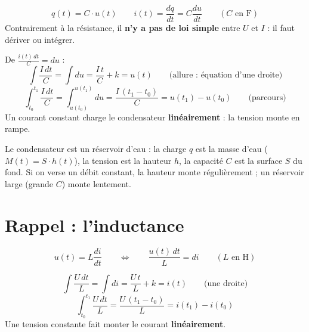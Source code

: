 
\begin{defnbox}[title={Le condensateur (appelé abusivement \og capacité\fg{})}]
\[ q(t) = C\cdot u(t) \qquad i(t) = \frac{dq}{dt} = C\frac{du}{dt} \qquad (C \text{ en F}) \]
Contrairement à la résistance, il \textbf{n'y a pas de loi simple} entre $U$ et $I$ : il faut
dériver ou intégrer.
\end{defnbox}

\begin{exbox}[title={Courant constant $i(t) = I$ dans un condensateur}]
De $\frac{i(t)\,dt}{C} = du$ :
\[ \int\frac{I\,dt}{C} = \int du = \frac{I\,t}{C} + k = u(t)
   \qquad\text{(allure : équation d'une droite)} \]
\[ \int_{t_0}^{t_1}\frac{I\,dt}{C} = \int_{u(t_0)}^{u(t_1)} du
   = \frac{I\,(t_1-t_0)}{C} = u(t_1) - u(t_0) \qquad\text{(parcours)} \]
Un courant constant charge le condensateur \textbf{linéairement} : la tension monte en rampe.
\end{exbox}

\begin{goatbox}
Le condensateur est un réservoir d'eau : la charge $q$ est la masse d'eau
($M(t) = S\cdot h(t)$), la tension est la hauteur $h$, la capacité $C$ est la surface $S$ du
fond. Si on verse un débit constant, la hauteur monte régulièrement ; un réservoir large
(grande $C$) monte lentement.
\end{goatbox}

\section{Rappel : l'inductance}


\begin{defnbox}[title=L'inductance]
\[ u(t) = L\frac{di}{dt} \qquad\Longleftrightarrow\qquad \frac{u(t)\,dt}{L} = di \qquad (L \text{ en H}) \]
\end{defnbox}

\begin{exbox}[title={Tension constante $u(t) = U$ sur une inductance}]
\[ \int\frac{U\,dt}{L} = \int di = \frac{U\,t}{L} + k = i(t) \qquad\text{(une droite)} \]
\[ \int_{t_0}^{t_1}\frac{U\,dt}{L} = \frac{U\,(t_1-t_0)}{L} = i(t_1) - i(t_0) \]
Une tension constante fait monter le courant \textbf{linéairement}.
\end{exbox}

